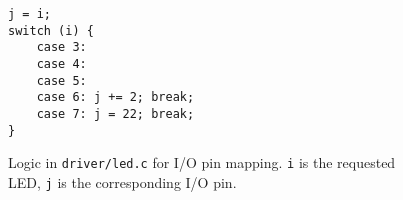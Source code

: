 \begin{figure}[ht]
\centering
\lstset{language=C,basicstyle=\ttfamily,numbers=left,firstnumber=28}
\begin{lstlisting}
j = i;
switch (i) {
    case 3:
    case 4:
    case 5:
    case 6: j += 2; break;
    case 7: j = 22; break;
}   
\end{lstlisting}
\caption{Logic in \texttt{driver/led.c} for I/O pin mapping. \texttt{i}
is the requested LED, \texttt{j} is the corresponding I/O pin.}
\label{lst:io_mapping}
\end{figure}
